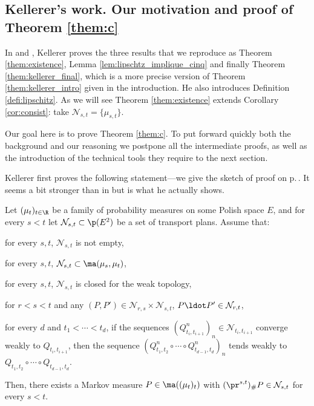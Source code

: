 \subsection{Kellerer's work. Our motivation and proof of Theorem \ref{them:c}}\label{subsec:proof_kelsto}

In \cite{Ke72} and \cite{Ke73}, Kellerer proves the three results that we reproduce as Theorem \ref{them:existence}, Lemma \ref{lem:lipschtz_implique_cinq} and finally Theorem \ref{them:kellerer_final}, which is a more precise version of Theorem \ref{them:kellerer_intro} given in the introduction. He also introduces Definition \ref{defi:lipschitz}. As we will see Theorem \ref{them:existence} extends Corollary \ref{cor:consist}: take $\mathcal{N}_{s,t}=\{\mu_{s,t}\}$.

Our goal here is to prove Theorem \ref{them:c}. To put forward quickly both the background and our reasoning we postpone all the intermediate proofs, as well as the introduction of the technical tools they require to the next section.

Kellerer first proves the following statement---we give the sketch of proof on p.\,\pageref{proof:them:existence}. It seems a bit stronger than in \cite{Ke72} but is what he actually shows.

\begin{them}[{\cite[Th.\,1]{Ke72}}]\label{them:existence}
Let $(\mu_t)_{t\in \R}$ be a family of probability measures on some Polish space $E$, and for every $s< t$ let $\mathcal{N}_{s,t}\subset\p(E^2)$ be a set of transport plans.
Assume that:
\begin{enumeratei}
\item\label{them:existence1}
for every $s,t$, $\mathcal{N}_{s,t}$ is not empty,
\item\label{them:existence2}
for every $s,t$, $\mathcal{N}_{s,t}\subset\ma(\mu_s,\mu_t)$,
\item\label{them:existence3}
for every $s,t$, $\mathcal{N}_{s,t}$ is closed for the weak topology,
\item\label{them:existence4}
for $r<s<t$ and any $(P,P')\in\mathcal{N}_{r,s}\times \mathcal{N}_{s,t}$, $P\ldot P'\in\mathcal{N}_{r,t}$,
\item\label{them:existence5}
 for every $d$ and $t_1<\cdots<t_d$, if the sequences $(Q^n_{t_i,t_{i+1}})_n\in \mathcal{N}_{t_i,t_{i+1}}$ converge weakly to $Q_{t_i,t_{i+1}}$, then the sequence $(Q^n_{t_1,t_2}\circ\cdots \circ Q^n_{t_{d-1},t_d})_{n}$ tends weakly to $Q_{t_1,t_2}\circ\cdots \circ Q_{t_{d-1},t_d}$.
\end{enumeratei}

Then, there exists a Markov measure $P\in\ma((\mu_t)_t)$ with $(\pr^{s,t})_\#P \in \mathcal{N}_{s,t}$ for every $s<t$.
\end{them}

